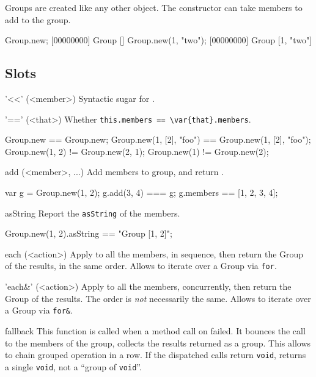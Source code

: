 Groups are created like any other object. The constructor can take members
to add to the group.

\begin{urbiscript}
Group.new;
[00000000] Group []
Group.new(1, "two");
[00000000] Group [1, "two"]
\end{urbiscript}

\subsection{Slots}

\begin{urbiscriptapi}
\item['<<'](<member>)%
  Syntactic sugar for .


\item['=='](<that>)%
  Whether \lstinline|this.members == \var{that}.members|.
\begin{urbiassert}
               Group.new == Group.new;
Group.new(1, [2], "foo") == Group.new(1, [2], "foo");
         Group.new(1, 2) != Group.new(2, 1);
            Group.new(1) != Group.new(2);
\end{urbiassert}


\item[add](<member>, ...)%
  Add members to \this group, and return \this.
\begin{urbiassert}
var g = Group.new(1, 2);
g.add(3, 4) === g;
g.members == [1, 2, 3, 4];
\end{urbiassert}


\item[asString]
  Report the \lstinline|asString| of the members.
\begin{urbiassert}
Group.new(1, 2).asString == "Group [1, 2]";
\end{urbiassert}


\item[each](<action>)%
  Apply  to all the members, in sequence, then return the
  Group of the results, in the same order.  Allows to iterate over a
  Group via \lstinline|for|.


\item['each&'](<action>)%
  Apply  to all the members, concurrently, then return the
  Group of the results.  The order is \emph{not} necessarily the same.
  Allows to iterate over a Group via \lstinline|for&|.


\item[fallback]
  This function is called when a method call on \this
  failed.  It bounces the call to the members of the group, collects
  the results returned as a group.  This allows to chain grouped
  operation in a row.  If the dispatched calls return
  \lstinline|void|, returns a single \lstinline|void|, not a ``group
  of \lstinline|void|''.



\end{urbiscriptapi}
